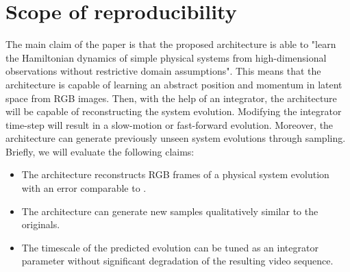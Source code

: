 



\section{Scope of reproducibility}
The main claim of the paper is that the proposed architecture is able to "learn the Hamiltonian dynamics of simple physical systems from high-dimensional observations without restrictive domain assumptions". This means that the architecture is capable of learning an abstract position and momentum in latent space from RGB images. Then, with the help of an integrator, the architecture will be capable of reconstructing the system evolution. Modifying the integrator time-step will result in a slow-motion or fast-forward evolution.
Moreover, the architecture can generate previously unseen system evolutions through sampling. Briefly, we will evaluate the following claims:
\begin{itemize}
    \item The architecture reconstructs RGB frames of a physical system evolution with an error comparable to \cite{hgn}.
    \item The architecture can generate new samples qualitatively similar to the originals.
    \item The timescale of the predicted evolution can be tuned as an integrator parameter without significant degradation of the resulting video sequence.    
\end{itemize}

